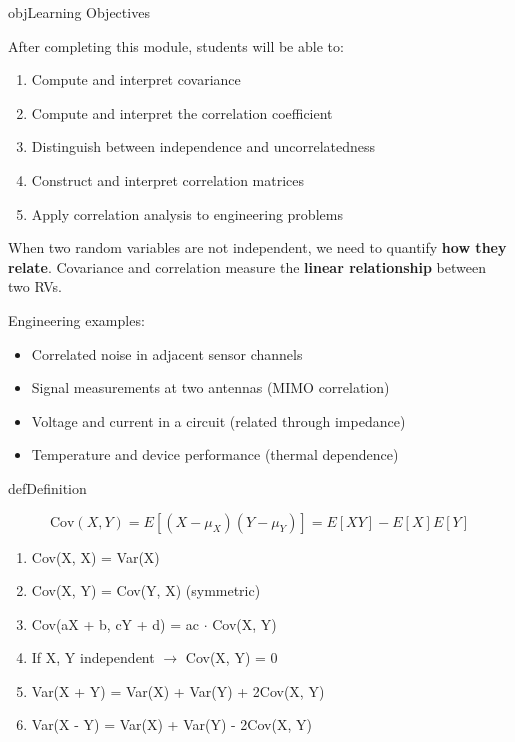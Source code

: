 \begin{PSbox}[unbreakable]{obj}{Learning Objectives}

After completing this module, students will be able to:

\begin{enumerate}
\def\labelenumi{\arabic{enumi}.}
\tightlist
\item
  Compute and interpret covariance
\item
  Compute and interpret the correlation coefficient
\item
  Distinguish between independence and uncorrelatedness
\item
  Construct and interpret correlation matrices
\item
  Apply correlation analysis to engineering problems
\end{enumerate}

\end{PSbox}


When two random variables are not independent, we need to quantify \textbf{how they relate}. Covariance and correlation measure the \textbf{linear relationship} between two RVs.

Engineering examples:

\begin{itemize}
\tightlist
\item
  Correlated noise in adjacent sensor channels
\item
  Signal measurements at two antennas (MIMO correlation)
\item
  Voltage and current in a circuit (related through impedance)
\item
  Temperature and device performance (thermal dependence)
\end{itemize}


\begin{PSbox}[unbreakable]{def}{Definition}

\[\text{Cov}(X,Y) = E[(X - \mu_X)(Y - \mu_Y)] = E[XY] - E[X]E[Y]\]

\end{PSbox}


\begin{enumerate}
\def\labelenumi{\arabic{enumi}.}
\tightlist
\item
  Cov(X, X) = Var(X)
\item
  Cov(X, Y) = Cov(Y, X) (symmetric)
\item
  Cov(aX + b, cY + d) = ac \ensuremath{\cdot} Cov(X, Y)
\item
  If X, Y independent \ensuremath{\to} Cov(X, Y) = 0
\item
  Var(X + Y) = Var(X) + Var(Y) + 2Cov(X, Y)
\item
  Var(X - Y) = Var(X) + Var(Y) - 2Cov(X, Y)
\end{enumerate}


